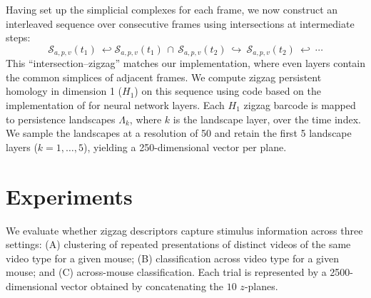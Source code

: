 \documentclass[11pt]{article}
\begin{document}
Having set up the simplicial complexes for each frame, we now construct an interleaved sequence over consecutive frames using intersections at intermediate steps:
\begin{equation}
\mathcal S_{a,p,v}(t_1)\ \hookleftarrow \mathcal S_{a,p,v}(t_1)\,\cap\, \mathcal S_{a,p,v}(t_2)\ \hookrightarrow\ \mathcal S_{a,p,v}(t_2)\ \hookleftarrow\ \cdots
\end{equation}
This “intersection–zigzag” matches our implementation, where even layers contain the common simplices of adjacent frames. We compute zigzag persistent homology in dimension 1 ($H_1$) on this sequence using code based on the implementation of \cite{gardinazzipersistent} for neural network layers.
Each $H_1$ zigzag barcode is mapped to persistence landscapes $\Lambda_k$, where $k$ is the landscape layer, over the time index. We sample the landscapes at a resolution of 50 and retain the first 5 landscape layers ($k=1,\dots,5$), yielding a 250-dimensional vector per plane. 



\section{Experiments}

We evaluate whether zigzag descriptors capture stimulus information across three settings: (A) clustering of repeated presentations of distinct videos of the same video type for a given mouse; (B)  classification across video type for a given mouse; and (C) across-mouse classification. Each trial is represented by a 2500-dimensional vector obtained by concatenating the $10$ $z$-planes.
\end{document}
